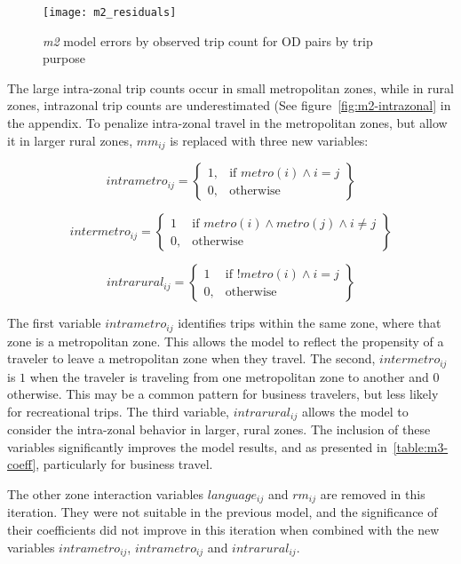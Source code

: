 \begin{figure}[H]
\centering
\texttt{[image: m2\_residuals]}
\caption{\textit{m2} model errors by observed trip count for OD pairs by trip purpose}
\label{fig:m2_residuals}
\end{figure}

The large intra-zonal trip counts occur in small metropolitan zones, while in rural zones, intrazonal trip counts are underestimated (See figure~\ref{fig:m2-intrazonal} in the appendix. To penalize intra-zonal travel in the metropolitan zones, but allow it in larger rural zones, $mm_{ij}$  is replaced with three new variables:

	$$	
	intrametro_{ij} = \left.
  \begin{cases}
    1, & \text{if } metro(i) \wedge i = j \\
    0, & \text{otherwise }
  \end{cases}
  \right\}
	$$
  
	$$	
	intermetro_{ij} = \left.
  \begin{cases}
    1 & \text{if } metro(i) \wedge metro(j) \wedge i \neq j \\
    0, & \text{otherwise } 
  \end{cases}
  \right\}
	$$  
	
	$$	
	intrarural_{ij} = \left.
  \begin{cases}
    1 & \text{if } !metro(i) \wedge i = j \\
    0, & \text{otherwise } 
  \end{cases}
  \right\}
	$$

The first variable $intrametro_{ij}$ identifies trips within the same zone, where that zone is a metropolitan zone. This allows the model to reflect the propensity of a traveler to leave a metropolitan zone when they travel. The second, $intermetro_{ij}$ is $1$ when the traveler is traveling from one metropolitan zone to another and $0$ otherwise. This may be a common pattern for business travelers, but less likely for recreational trips. The third variable, $intrarural_{ij}$ allows the model to consider the intra-zonal behavior in larger, rural zones. The inclusion of these variables significantly improves the model results, and as presented in~\ref{table:m3-coeff}, particularly for business travel.

The other zone interaction variables $language_{ij}$  and $rm_{ij}$  are removed in this iteration. They were not suitable in the previous model, and the significance of their coefficients did not improve in this iteration when combined with the new variables $intrametro_{ij}$,  $intrametro_{ij}$ and $intrarural_{ij}$.



